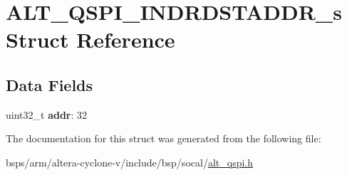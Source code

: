 \hypertarget{structALT__QSPI__INDRDSTADDR__s}{}\section{A\+L\+T\+\_\+\+Q\+S\+P\+I\+\_\+\+I\+N\+D\+R\+D\+S\+T\+A\+D\+D\+R\+\_\+s Struct Reference}
\label{structALT__QSPI__INDRDSTADDR__s}
\subsection*{Data Fields}
\begin{DoxyCompactItemize}
\item 
\mbox{\label{structALT__QSPI__INDRDSTADDR__s_a8a948e18b8dfbd999913e55858bc6ac9}} 
uint32\+\_\+t {\bfseries addr}\+: 32
\end{DoxyCompactItemize}


The documentation for this struct was generated from the following file\+:\begin{DoxyCompactItemize}
\item 
bsps/arm/altera-\/cyclone-\/v/include/bsp/socal/\mbox{\hyperlink{include_2bsp_2socal_2alt__qspi_8h}{alt\+\_\+qspi.\+h}}\end{DoxyCompactItemize}
